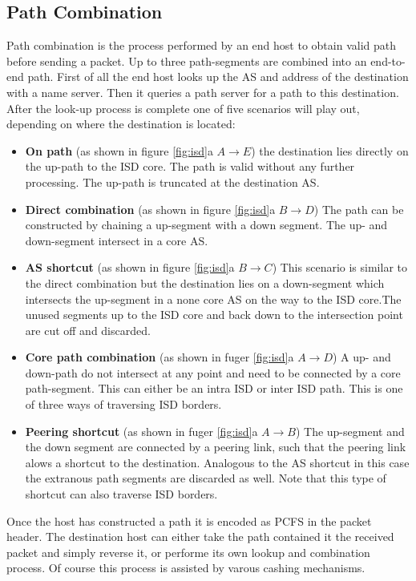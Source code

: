 \documentclass[../eva1_scion.tex]{subfiles}
\begin{document}
    \subsection{Path Combination} \label{ssec:path_assembly}
    Path combination is the process performed by an end host to obtain valid path before sending a packet. Up to three path-segments are combined into an end-to-end path. First of all the end host looks up the AS and address of the destination with a name server. Then it queries a path server for a path to this destination. After the look-up process is complete one of five scenarios will play out, depending on where the destination is located:

    \begin{itemize}
        \item \textbf{On path} (as shown in figure \ref{fig:isd}a $A \rightarrow E$) the destination lies directly on the up-path to the ISD core. The path is valid without any further processing. The up-path is truncated at the destination AS.
        \item \textbf{Direct combination} (as shown in figure \ref{fig:isd}a $B \rightarrow D$) The path can be constructed by chaining a up-segment with a down segment. The up- and down-segment intersect in a core AS.
        \item \textbf{AS shortcut} (as shown in figure \ref{fig:isd}a $B \rightarrow C$) This scenario is similar to the direct combination but the destination lies on a down-segment which intersects the up-segment in a none core AS on the way to the ISD core.The unused segments up to the ISD core and back down to the intersection point are cut off and discarded.
        \item \textbf{Core path combination} (as shown in fuger \ref{fig:isd}a $A \rightarrow D$) A up- and down-path do not intersect at any point and need to be connected by a core path-segment. This can either be an intra ISD or inter ISD path. This is one of three ways of traversing ISD borders.
        \item \textbf{Peering shortcut} (as shown in fuger \ref{fig:isd}a $A \rightarrow B$) The up-segment and the down segment are connected by a peering link, such that the peering link alows a shortcut to the destination. Analogous to the AS shortcut in this case the extranous path segments are discarded as well. Note that this type of shortcut can also traverse ISD borders.
    \end{itemize}

    Once the host has constructed a path it is encoded as PCFS in the packet header. The destination host can either take the path contained it the received packet and simply reverse it, or performe its own lookup and combination process. Of course this process is assisted by varous cashing mechanisms.
\end{document}
